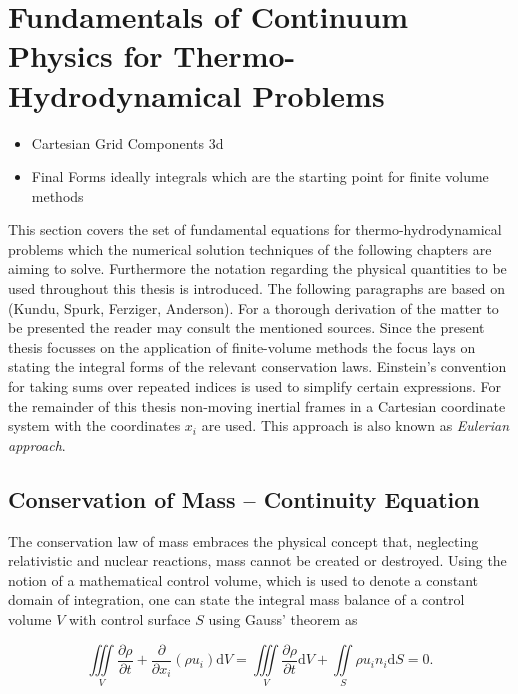 
  \section{Fundamentals of Continuum Physics for Thermo-Hydrodynamical Problems}

    \begin{itemize}
        \item Cartesian Grid Components 3d
        \item Final Forms ideally integrals which are the starting point for finite volume methods
      \end{itemize}

      This section covers the set of fundamental equations for thermo-hydrodynamical problems which the numerical solution techniques of the following chapters are aiming to solve. Furthermore the notation regarding the physical quantities to be used throughout this thesis is introduced. The following paragraphs are based on (Kundu, Spurk, Ferziger, Anderson). For a thorough derivation of the matter to be presented the reader may consult the mentioned sources. Since the present thesis focusses on the application of finite-volume methods the focus lays on stating the integral forms of the relevant conservation laws. Einstein's convention for taking sums over repeated indices is used to simplify certain expressions. For the remainder of this thesis non-moving inertial frames in a Cartesian coordinate system with the coordinates \( x_i \) are used. This approach is also known as \textit{Eulerian approach}. 

    \subsection{Conservation of Mass -- Continuity Equation}

    The conservation law of mass embraces the physical concept that, neglecting relativistic and nuclear reactions, mass cannot be created or destroyed. Using the notion of a mathematical control volume, which is used to denote a constant domain of integration, one can state the integral mass balance of a control volume \(V\) with control surface \(S\) using Gauss' theorem as

    \begin{equation}
      \iiint\limits_V \frac{\partial \rho}{\partial t} + \frac{\partial}{\partial x_i}\left( \rho u_i \right) \mathrm{d}V 
      =  \iiint\limits_V \frac{\partial \rho}{\partial t} \mathrm{d}V + \iint\limits_S \rho u_i n_i \mathrm{d}S
      = 0.
    \end{equation}

